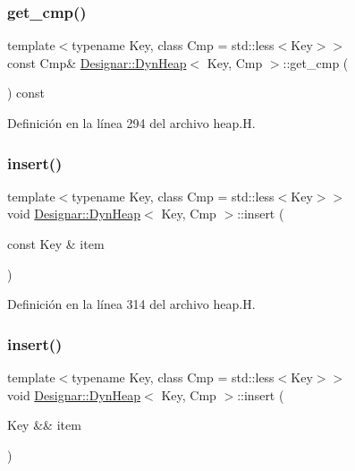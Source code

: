 \subsubsection{\texorpdfstring{get\+\_\+cmp()}{get\_cmp()}\hspace{0.1cm}{\footnotesize\ttfamily [2/2]}}
{\footnotesize\ttfamily template$<$typename Key, class Cmp = std\+::less$<$\+Key$>$$>$ \\
const Cmp\& \hyperlink{class_designar_1_1_dyn_heap}{Designar\+::\+Dyn\+Heap}$<$ Key, Cmp $>$\+::get\+\_\+cmp (\begin{DoxyParamCaption}{ }\end{DoxyParamCaption}) const\hspace{0.3cm}{\ttfamily [inline]}}



Definición en la línea 294 del archivo heap.\+H.

\mbox{\label{class_designar_1_1_dyn_heap_aba3a8286ddea8098ab89e18658ec1e3c}} 
\subsubsection{\texorpdfstring{insert()}{insert()}\hspace{0.1cm}{\footnotesize\ttfamily [1/2]}}
{\footnotesize\ttfamily template$<$typename Key, class Cmp = std\+::less$<$\+Key$>$$>$ \\
void \hyperlink{class_designar_1_1_dyn_heap}{Designar\+::\+Dyn\+Heap}$<$ Key, Cmp $>$\+::insert (\begin{DoxyParamCaption}\item[{const Key \&}]{item }\end{DoxyParamCaption})\hspace{0.3cm}{\ttfamily [inline]}}



Definición en la línea 314 del archivo heap.\+H.

\mbox{\label{class_designar_1_1_dyn_heap_a28d454d027e576f9fc6f1c888c5e8809}} 
\subsubsection{\texorpdfstring{insert()}{insert()}\hspace{0.1cm}{\footnotesize\ttfamily [2/2]}}
{\footnotesize\ttfamily template$<$typename Key, class Cmp = std\+::less$<$\+Key$>$$>$ \\
void \hyperlink{class_designar_1_1_dyn_heap}{Designar\+::\+Dyn\+Heap}$<$ Key, Cmp $>$\+::insert (\begin{DoxyParamCaption}\item[{Key \&\&}]{item }\end{DoxyParamCaption})\hspace{0.3cm}{\ttfamily [inline]}}



